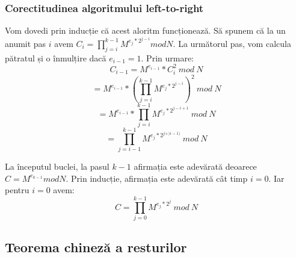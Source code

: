 \documentclass[12]{report}
\begin{document}
      \subsubsection{Corectitudinea algoritmului left-to-right}
      Vom dovedi prin inducție că acest aloritm funcționează. Să spunem că la un anumit pas $i$ avem $ C_i = \prod_{j=i}^{k-1} {M^{e_j*2^{j-i}}} mod N$. La următorul pas, vom calcula pătratul și o înmulțire dacă $ e_{i-1} = 1 $. Prin urmare: \\
      $$ C_{i-1} = M^{e_{i-1}}*C_{i}^2 \ mod \ N$$
      $$ = M^{e_{i-1}} * \left( \prod_{j=i}^{k-1} M^{e_j*2^{j-i}} \right)^2 \ mod \ N $$
      $$ = M^{e_{i-1}} * \prod_{j=i}^{k-1} M^{e_j*2^{j-i+1}} \ mod \ N$$
      $$ = \prod_{j=i-1}^{k-1} M^{e_j*2^{j+)i-1)}} \ mod \ N $$
      
      La începutul buclei, la pasul $ k-1 $ afirmația este adevărată deoarece $ C = M^{e_{k-1}} mod N$. Prin inducție, afirmația este adevărată cât timp $ i=0$. Iar pentru $i=0$ avem: \\
      $$ C= \prod_{j=0}^{k-1} M^{e_j * 2^j}  \ mod \ N $$
      
     \subsection{Teorema chineză a resturilor}
\end{document}
